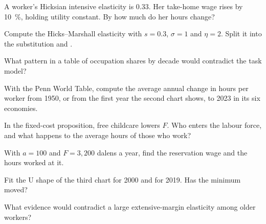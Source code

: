 \begin{exercise}[$\star$]\label{exo:b3:labour-supply-and-demand:2}
A worker's Hicksian intensive elasticity is 0.33. Her take-home wage rises by 10~\%,
holding utility constant. By how much do her hours change?
\end{exercise}

\begin{exercise}[$\star$]\label{exo:b3:labour-supply-and-demand:3}
Compute the Hicks--Marshall elasticity with $s = 0.3$, $\sigma = 1$ and $\eta = 2$. Split it into the
substitution and .
\end{exercise}

\begin{exercise}[$\star$]\label{exo:b3:labour-supply-and-demand:4}
What pattern in a table of occupation shares by decade would contradict the task
model?
\end{exercise}

\begin{exercise}[$\star\star$]\label{exo:b3:labour-supply-and-demand:5}
With the Penn World Table, compute the average annual change in hours per worker
from 1950, or from the first year the second chart shows, to 2023 in its six economies.
\end{exercise}

\begin{exercise}[$\star\star$]\label{exo:b3:labour-supply-and-demand:6}
In the fixed-cost proposition, free childcare lowers $F$. Who enters the labour force,
and what happens to the average hours of those who work?
\end{exercise}

\begin{exercise}[$\star\star$]\label{exo:b3:labour-supply-and-demand:7}
With $a = 100$ and $F = 3{,}200$ dalens a year, find the reservation wage and
the hours worked at it.
\end{exercise}

\begin{exercise}[$\star\star$]\label{exo:b3:labour-supply-and-demand:8}
Fit the U shape of the third chart for 2000 and for 2019. Has the minimum moved?
\end{exercise}

\begin{exercise}[$\star\star$]\label{exo:b3:labour-supply-and-demand:9}
What evidence would contradict a large extensive-margin elasticity among older
workers?
\end{exercise}

